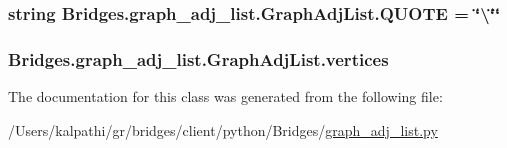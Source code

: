 \subsubsection[{Q\+U\+O\+T\+E}]{\setlength{\rightskip}{0pt plus 5cm}string Bridges.\+graph\+\_\+adj\+\_\+list.\+Graph\+Adj\+List.\+Q\+U\+O\+T\+E = \char`\"{}\textbackslash{}\char`\"{}\char`\"{}\hspace{0.3cm}{\ttfamily [static]}}\label{class_bridges_1_1graph__adj__list_1_1_graph_adj_list_a6adf6e943f5fa2d30144a258293caf25}
\hypertarget{class_bridges_1_1graph__adj__list_1_1_graph_adj_list_a3efee49a2137c200d4e21ab28498d209}{}
\subsubsection[{vertices}]{\setlength{\rightskip}{0pt plus 5cm}Bridges.\+graph\+\_\+adj\+\_\+list.\+Graph\+Adj\+List.\+vertices}\label{class_bridges_1_1graph__adj__list_1_1_graph_adj_list_a3efee49a2137c200d4e21ab28498d209}


The documentation for this class was generated from the following file\+:\begin{DoxyCompactItemize}
\item 
/\+Users/kalpathi/gr/bridges/client/python/\+Bridges/\hyperlink{graph__adj__list_8py}{graph\+\_\+adj\+\_\+list.\+py}\end{DoxyCompactItemize}
